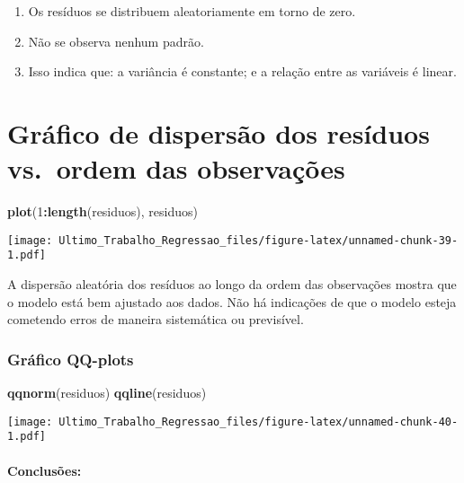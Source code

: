 \documentclass[
]{article}
\newenvironment{Shaded}{\begin{snugshade}}{\end{snugshade}}
\newcommand{\DecValTok}[1]{\textcolor[rgb]{0.00,0.00,0.81}{#1}}
\newcommand{\FunctionTok}[1]{\textcolor[rgb]{0.13,0.29,0.53}{\textbf{#1}}}
\newcommand{\NormalTok}[1]{#1}
\newcommand{\SpecialCharTok}[1]{\textcolor[rgb]{0.81,0.36,0.00}{\textbf{#1}}}
\providecommand{\tightlist}{%
  \setlength{\itemsep}{0pt}\setlength{\parskip}{0pt}}
\begin{document}
\begin{enumerate}
\def\labelenumi{\arabic{enumi}.}
\tightlist
\item
  Os resíduos se distribuem aleatoriamente em torno de zero.
\item
  Não se observa nenhum padrão.
\item
  Isso indica que: a variância é constante; e a relação entre as
  variáveis é linear.
\end{enumerate}

\hypertarget{gruxe1fico-de-dispersuxe3o-dos-resuxedduos-vs.-ordem-das-observauxe7uxf5es}{%
\section{Gráfico de dispersão dos resíduos vs.~ordem das
observações}\label{gruxe1fico-de-dispersuxe3o-dos-resuxedduos-vs.-ordem-das-observauxe7uxf5es}}

\begin{Shaded}
\begin{Highlighting}[]
\FunctionTok{plot}\NormalTok{(}\DecValTok{1}\SpecialCharTok{:}\FunctionTok{length}\NormalTok{(residuos), residuos)}
\end{Highlighting}
\end{Shaded}

\texttt{[image: Ultimo\_Trabalho\_Regressao\_files/figure-latex/unnamed-chunk-39-1.pdf]}

A dispersão aleatória dos resíduos ao longo da ordem das observações
mostra que o modelo está bem ajustado aos dados. Não há indicações de
que o modelo esteja cometendo erros de maneira sistemática ou
previsível.

\hypertarget{gruxe1fico-qq-plots}{%
\subsubsection{Gráfico QQ-plots}\label{gruxe1fico-qq-plots}}

\begin{Shaded}
\begin{Highlighting}[]
\FunctionTok{qqnorm}\NormalTok{(residuos)}
\FunctionTok{qqline}\NormalTok{(residuos) }
\end{Highlighting}
\end{Shaded}

\texttt{[image: Ultimo\_Trabalho\_Regressao\_files/figure-latex/unnamed-chunk-40-1.pdf]}

\hypertarget{conclusuxf5es-4}{%
\paragraph{Conclusões:}\label{conclusuxf5es-4}}
\end{document}
